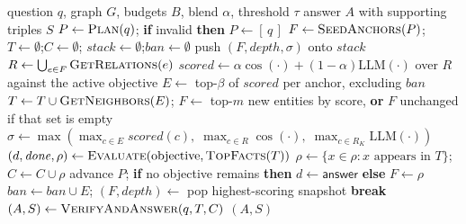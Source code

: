 \begin{algorithm}[!tb]
  \caption[AGR navigation]{AGR navigation (verification layer abstracted; see
    )}
  \label{alg:agr}
  \begin{algorithmic}[1]
    \REQUIRE question $q$, graph $G$, budgets $B$, blend $\alpha$, threshold
      $\tau$
    \ENSURE answer $A$ with supporting triples $S$
    \STATE $P \gets \textsc{Plan}(q)$; \textbf{if} invalid \textbf{then}
      $P \gets [\,q\,]$
    \STATE $F \gets \textsc{SeedAnchors}(P)$;\quad
      $T \gets \emptyset$;\quad $C \gets \emptyset$;\quad
      $\mathit{stack} \gets \emptyset$;\quad $\mathit{ban} \gets \emptyset$
      \STATE push $(F, \mathit{depth}, \sigma)$ onto $\mathit{stack}$
      \STATE $R \gets \bigcup_{e \in F} \textsc{GetRelations}(e)$
      \STATE $\mathit{scored} \gets \alpha\cos(\cdot) + (1-\alpha)\mathrm{LLM}
        (\cdot)$ over $R$ against the active objective
      \STATE $E \gets$ top-$\beta$ of $\mathit{scored}$ per anchor, excluding
        $\mathit{ban}$
      \STATE $T \gets T \cup \textsc{GetNeighbors}(E)$;\quad
        $F \gets$ top-$m$ new entities by score, \textbf{or} $F$ unchanged if
        that set is empty 
      \STATE $\sigma \gets \max(\max_{c \in E}\mathit{scored}(c),\;
        \max_{c \in R}\cos(\cdot),\; \max_{c \in R_K}\mathrm{LLM}(\cdot))$
      \STATE $(d, \mathit{done}, \rho) \gets \textsc{Evaluate}
        (\text{objective}, \textsc{TopFacts}(T))$
      \STATE $\rho \gets \{x \in \rho : x \text{ appears in } T\}$;\quad
        $C \gets C \cup \rho$
        \STATE advance $P$; \textbf{if} no objective remains \textbf{then}
          $d \gets \textsf{answer}$ \textbf{else} $F \gets \rho$
      \ENDIF
        \STATE $\mathit{ban} \gets \mathit{ban} \cup E$;\quad
          $(F, \mathit{depth}) \gets$ pop highest-scoring snapshot
        \STATE \textbf{break}
      \ENDIF
    \ENDWHILE
    \STATE $(A, S) \gets \textsc{VerifyAndAnswer}(q, T, C)$
    \RETURN $(A, S)$
  \end{algorithmic}
\end{algorithm}



